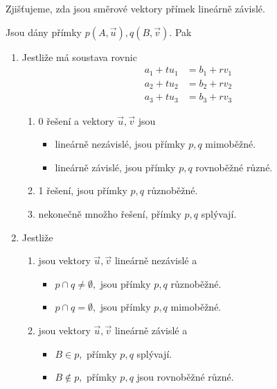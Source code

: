 \begin{reseni}
Zjišťujeme, zda jsou směrové vektory přímek lineárně závislé.
\end{reseni}

\begin{veta}
    Jsou dány přímky $p(A,\vec u), q(B,\vec v).$ Pak
    \begin{enumerate}[$i.$]
    \item Jestliže má soustava rovnic
    \begin{align*}
        a_1+tu_1 &= b_1 + rv_1 \\
        a_2+tu_2 &= b_2 + rv_2 \\
        a_3+tu_3 &= b_3 + rv_3
    \end{align*}
    \begin{enumerate}[$a.$]
    \item 0 řešení a vektory $\vec u, \vec v$ jsou
    \begin{itemize}
    \item lineárně nezávislé, jsou přímky $p,q$ mimoběžné.
   	\item lineárně závislé, jsou přímky $p,q$ rovnoběžné různé.
    \end{itemize}
   	\item 1 řešení, jsou přímky $p,q$ různoběžné.
   	\item nekonečně množho řešení, přímky $p,q$ splývají.
    \end{enumerate}
   	\item Jestliže
    \begin{enumerate}[$a.$]
    \item jsou vektory $\vec u, \vec v$ lineárně nezávislé a
    \begin{itemize}
    \item $p\cap q \ne \emptyset,$ jsou přímky $p,q$ různoběžné.
   	\item $p\cap q = \emptyset,$ jsou přímky $p,q$ mimoběžné.
    \end{itemize}
   	\item jsou vektory $\vec u, \vec v$ lineárně závislé a
   	\begin{itemize}
    \item $B\in p,$ přímky $p,q$ splývají.
   	\item $B\notin p,$ přímky $p,q$ jsou rovnoběžné různé.
    \end{itemize}
    \end{enumerate}
    \end{enumerate}
\end{veta}

